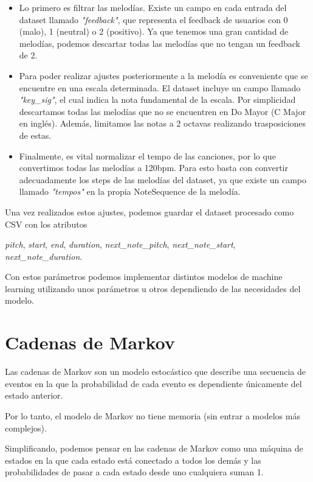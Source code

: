 \begin{itemize}
\item Lo primero es filtrar las melodías. Existe un campo en cada entrada del dataset llamado \textit{"feedback"}, que representa el feedback de usuarios con 0 (malo), 1 (neutral) o 2 (positivo). Ya que tenemos una gran cantidad de melodías, podemos descartar todas las melodías que no tengan un feedback de 2.

\item Para poder realizar ajustes posteriormente a la melodía es conveniente que se encuentre en una escala determinada. El dataset incluye un campo llamado \textit{"key\_sig"}, el cual indica la nota fundamental de la escala. Por simplicidad descartamos todas las melodías que no se encuentren en Do Mayor (C Major en inglés). Además, limitamos las notas a 2 octavas realizando trasposiciones de estas.

\item Finalmente, es vital normalizar el tempo de las canciones, por lo que convertimos todas las melodías a 120bpm. Para esto basta con convertir adecuadamente los steps de las melodías del dataset, ya que existe un campo llamado \textit{"tempos"} en la propia NoteSequence de la melodía.

\end{itemize}

Una vez realizados estos ajustes, podemos guardar el dataset procesado como CSV con los atributos
\begin{center}
    \textit{pitch}, \textit{start}, \textit{end}, \textit{duration}, \textit{next\_note\_pitch}, \textit{next\_note\_start}, \textit{next\_note\_duration}.
\end{center}
Con estos parámetros podemos implementar distintos modelos de machine learning utilizando unos parámetros u otros dependiendo de las necesidades del modelo.

\section{Cadenas de Markov}
\label{sec:Markov-chain}

    Las cadenas de Markov son un modelo estocástico que describe una secuencia de eventos en la que la probabilidad de cada evento es dependiente únicamente del estado anterior.

    Por lo tanto, el modelo de Markov no tiene memoria (sin entrar a modelos más complejos).

    Simplificando, podemos pensar en las cadenas de Markov como una máquina de estados en la que cada estado está conectado a todos los demás y las probabilidades de pasar a cada estado desde uno cualquiera suman 1.


